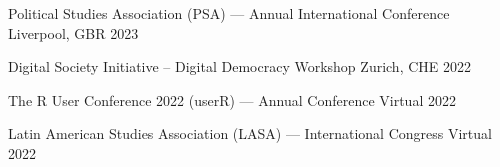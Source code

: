 \begin{cvhonors}
\cvconf
{Political Studies Association (PSA) --- Annual International Conference} 
{Liverpool, GBR}
{2023}
\end{cvhonors}



\begin{cvhonors}
\cvconf
{Digital Society Initiative -- Digital Democracy Workshop} 
{Zurich, CHE}
{2022}
\end{cvhonors}




\begin{cvhonors}
\cvconf
{The R User Conference 2022 (userR) --- Annual Conference} 
{Virtual}
{2022}
\end{cvhonors}

\begin{cvhonors}
\cvconf
{Latin American Studies Association (LASA) --- International Congress} 
{Virtual}
{2022}
\end{cvhonors}




